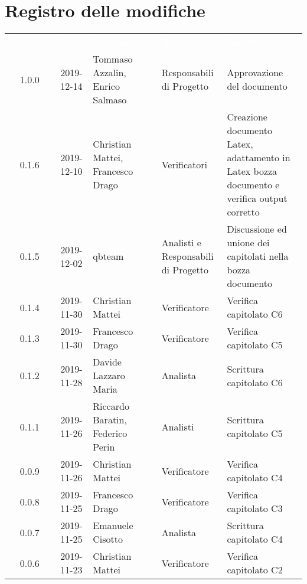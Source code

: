 \section*{Registro delle modifiche}
{
\renewcommand{\arraystretch}{1.5}
\centering
\begin{longtable}{ c c  C{4cm}  C{3cm} C{4cm}}
\textcolor{white}{\textbf{Versione}} & \textcolor{white}{\textbf{Data}} & \textcolor{white}{\textbf{Nominativo}} & \textcolor{white}{\textbf{Ruolo}} & \textcolor{white}{\textbf{Descrizione}}\\	

1.0.0 & 2019-12-14 & Tommaso Azzalin, Enrico Salmaso & Responsabili di Progetto & Approvazione del documento \\	
		
0.1.6 & 2019-12-10 & Christian Mattei, Francesco Drago & Verificatori & Creazione documento Latex, adattamento in Latex bozza documento e verifica output corretto\\

0.1.5 & 2019-12-02 & qbteam & Analisti e Responsabili di Progetto & Discussione ed unione dei capitolati nella bozza documento \\


0.1.4 & 2019-11-30 & Christian Mattei & Verificatore & Verifica capitolato C6 \\

0.1.3 & 2019-11-30 & Francesco Drago & Verificatore & Verifica capitolato C5 \\

0.1.2 & 2019-11-28 & Davide Lazzaro Maria & Analista & Scrittura capitolato C6 \\

0.1.1 & 2019-11-26 & Riccardo Baratin, Federico Perin & Analisti & Scrittura capitolato C5 \\

0.0.9 & 2019-11-26 & Christian Mattei & Verificatore & Verifica capitolato C4 \\

0.0.8 & 2019-11-25 & Francesco Drago & Verificatore & Verifica capitolato C3 \\

0.0.7 & 2019-11-25 & Emanuele Cisotto & Analista & Scrittura capitolato C4 \\

0.0.6 & 2019-11-23 & Christian Mattei & Verificatore & Verifica capitolato C2 \\


\end{longtable}}
